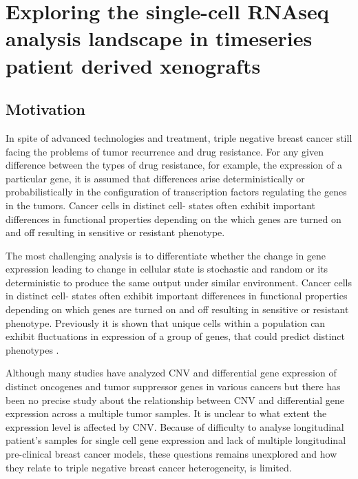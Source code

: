 
{\chapter{Exploring the single-cell RNAseq analysis landscape in timeseries patient derived xenografts}

}
 \label{ch:Chapter5}
 \section{Motivation}

In spite of advanced technologies and treatment, triple negative breast cancer still facing the problems of tumor recurrence and drug resistance.
For any given difference between the types of drug resistance, for example, the expression of a particular gene, it is assumed that differences arise deterministically or probabilistically in the configuration of transcription factors regulating the genes in the tumors. Cancer cells in distinct cell- states often exhibit important differences in functional properties depending on the which genes are turned on and off resulting in sensitive or resistant phenotype.

The most challenging analysis is to differentiate whether the change in gene expression leading to change in cellular state is stochastic\cite{raj2008nature} and random or its deterministic to produce the same output under similar environment.
Cancer cells in distinct cell- states often exhibit important differences in functional properties depending on which genes are turned on and off resulting in sensitive  or resistant phenotype.
Previously it is shown that unique cells within a population can exhibit fluctuations in expression of a group of genes, that could predict distinct phenotypes \cite{shaffer2019memory}.

Although many studies have analyzed CNV and differential gene expression of distinct oncogenes and tumor suppressor genes in various cancers \cite{kuzyk2015mycn, budczies2016pan, kwak2015fibroblast} but there has been no precise study about the relationship between CNV and differential gene expression across a multiple tumor samples. It is unclear to what extent the expression level is affected by CNV.  Because of difficulty to analyse longitudinal patient's samples for single cell gene expression and lack of multiple longitudinal pre-clinical breast cancer models, these questions remains unexplored and how they relate to triple negative breast cancer heterogeneity, is limited.


